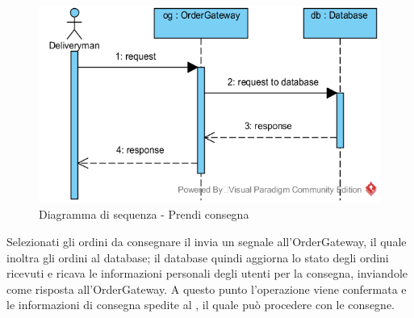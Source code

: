 \begin{figure}[H]
	\centering
	\includegraphics[width=14cm]{../../documenti/SpecificaTecnica/diagrammi_img/sequenza/fattorino_prendi_consegna.png}
	\caption{Diagramma di sequenza - Prendi consegna}
\end{figure}
Selezionati gli ordini da consegnare il \Deliveryman{} invia un segnale all'Order\-Gateway, il quale inoltra gli ordini al database; il database quindi aggiorna lo stato degli ordini ricevuti e ricava le informazioni personali degli utenti per la consegna, inviandole come risposta all'Order\-Gateway. A questo punto l'operazione viene confermata e le informazioni di consegna spedite al \Deliveryman{}, il quale può procedere con le consegne.

